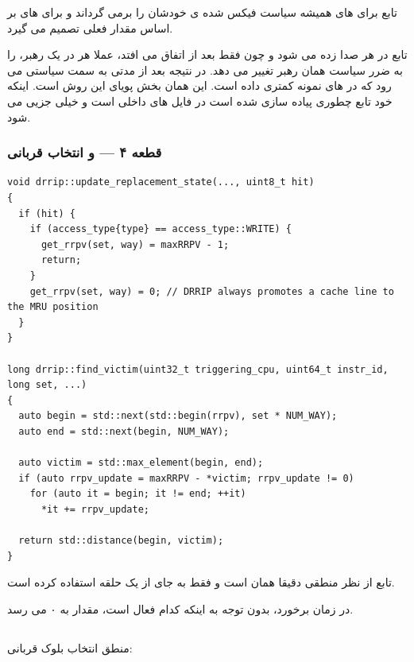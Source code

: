 \documentclass[12pt,a4paper]{article}
\begin{document}
تابع  برای  های  همیشه سیاست فیکس شده ی خودشان را برمی گرداند و برای  های  بر اساس مقدار فعلی  تصمیم می گیرد.

تابع  در هر  صدا زده می شود و چون  فقط بعد از  اتفاق می افتد، عملا هر  در یک  رهبر،  را به ضرر سیاست همان رهبر تغییر می دهد. در نتیجه بعد از مدتی  به سمت سیاستی می رود که در  های نمونه  کمتری داده است. این همان بخش پویای این روش است. اینکه خود تابع  چطوری پیاده سازی شده است در فایل های داخلی  است و خیلی جزیی می شود.

\subsubsection{قطعه ۴ —  و انتخاب قربانی}

\begin{latin}
\begin{lstlisting}
void drrip::update_replacement_state(..., uint8_t hit)
{
  if (hit) {
    if (access_type{type} == access_type::WRITE) {
      get_rrpv(set, way) = maxRRPV - 1;
      return;
    }
    get_rrpv(set, way) = 0; // DRRIP always promotes a cache line to the MRU position
  }
}

long drrip::find_victim(uint32_t triggering_cpu, uint64_t instr_id, long set, ...)
{
  auto begin = std::next(std::begin(rrpv), set * NUM_WAY);
  auto end = std::next(begin, NUM_WAY);

  auto victim = std::max_element(begin, end);
  if (auto rrpv_update = maxRRPV - *victim; rrpv_update != 0)
    for (auto it = begin; it != end; ++it)
      *it += rrpv_update;

  return std::distance(begin, victim);
}
\end{lstlisting}
\end{latin}

تابع  از نظر منطقی دقیقا همان  است و فقط به جای  از یک حلقه استفاده کرده است.

در زمان برخورد، بدون توجه به اینکه کدام  فعال است، مقدار  به ۰ می رسد.

\subsection{}

منطق انتخاب بلوک قربانی:
\end{document}
